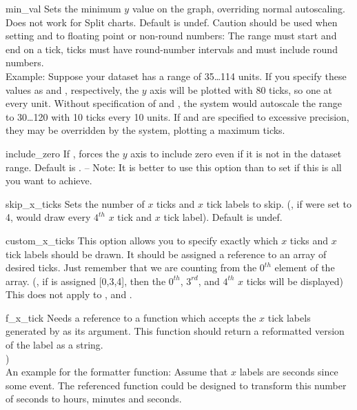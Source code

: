 \begin{AttrDecl}{min\_val}
Sets the minimum $y$ value on the graph, overriding normal autoscaling.
Does not work for Split charts. Default is undef. Caution should be
used when setting  and  to
floating point or non-round numbers: The range must start and end on a
tick, ticks must have round-number intervals and must include round
numbers.\\
Example: Suppose your dataset has a range of 35\ldots 114
units. If you specify these values as  and
, respectively, the $y$ axis will be plotted with 80
ticks, so one at every unit. Without specification of
 and , the system would
autoscale the range to 30\ldots 120 with 10 ticks every 10 units. If
 and  are specified to excessive
precision, they may be overridden by the system, plotting a maximum
 ticks.
\end{AttrDecl}

\begin{AttrDecl}{include\_zero}
If , forces the $y$ axis to include zero even if it is
not in the dataset range. Default is . -- Note:
It is better to use this option than to set 
if this is all you want to achieve.
\end{AttrDecl}

\begin{AttrDecl}{skip\_x\_ticks}
Sets the number of $x$ ticks and $x$ tick labels to skip. (\Ie, if
 were set to 4, \chart would draw every
$4^{th}$ $x$ tick and $x$ tick label). Default is undef.
\end{AttrDecl}

\begin{AttrDecl}{custom\_x\_ticks}
This option allows you to specify exactly which $x$ ticks and $x$ tick
labels should be drawn. It should be assigned a reference to an array of
desired ticks. Just remember that we are counting from the $0^{th}$
element of the array. (\Eg, if  is assigned
[0,3,4], then the $0^{th}$, $3^{rd}$, and $4^{th}$ $x$ ticks will be
displayed) This does not apply to ,
 and .
\end{AttrDecl}

\begin{AttrDecl}{f\_x\_tick}
Needs a reference to a function which accepts the $x$ tick labels
generated by  as its argument. This function
should return a reformatted version of the label as a string. \Eg\\
)\\
An example for the formatter function: Assume that $x$ labels are
seconds since some event. The referenced function could be designed to
transform this number of seconds to hours, minutes and seconds.
\end{AttrDecl}

